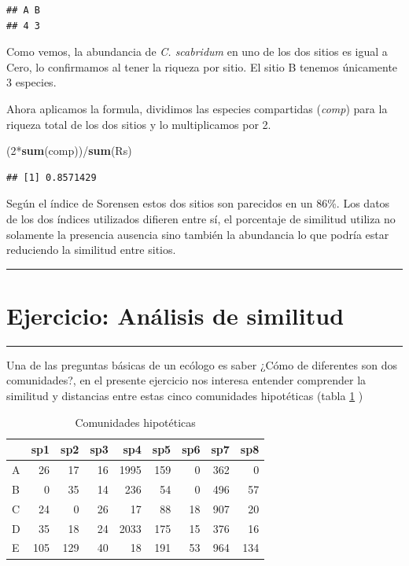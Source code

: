 \documentclass[]{book}
\newenvironment{Shaded}{\begin{snugshade}}{\end{snugshade}}
\newcommand{\KeywordTok}[1]{\textcolor[rgb]{0.13,0.29,0.53}{\textbf{{#1}}}}
\newcommand{\DecValTok}[1]{\textcolor[rgb]{0.00,0.00,0.81}{{#1}}}
\newcommand{\NormalTok}[1]{{#1}}
\begin{document}
\begin{verbatim}
## A B 
## 4 3
\end{verbatim}

Como vemos, la abundancia de \emph{C. scabridum} en uno de los dos
sitios es igual a Cero, lo confirmamos al tener la riqueza por sitio. El
sitio B tenemos únicamente 3 especies.

Ahora aplicamos la formula, dividimos las especies compartidas
(\emph{comp}) para la riqueza total de los dos sitios y lo multiplicamos
por 2.

\begin{Shaded}
\begin{Highlighting}[]
\NormalTok{(}\DecValTok{2}\NormalTok{*}\KeywordTok{sum}\NormalTok{(comp))/}\KeywordTok{sum}\NormalTok{(Rs)}
\end{Highlighting}
\end{Shaded}

\begin{verbatim}
## [1] 0.8571429
\end{verbatim}

Según el índice de Sorensen estos dos sitios son parecidos en un 86\%.
Los datos de los dos índices utilizados difieren entre sí, el porcentaje
de similitud utiliza no solamente la presencia ausencia sino también la
abundancia lo que podría estar reduciendo la similitud entre sitios.

\begin{center}\rule{0.5\linewidth}{\linethickness}\end{center}

\section{Ejercicio: Análisis de
similitud}\label{ejercicio-analisis-de-similitud}

\begin{center}\rule{0.5\linewidth}{\linethickness}\end{center}

Una de las preguntas básicas de un ecólogo es saber ¿Cómo de diferentes
son dos comunidades?, en el presente ejercicio nos interesa entender
comprender la similitud y distancias entre estas cinco comunidades
hipotéticas (tabla \ref{tab:ejer1} )

\begin{table}

\caption{\label{tab:ejer1}Comunidades hipotéticas}
\centering
\begin{tabular}[t]{lrrrrrrrr}
\toprule
  & sp1 & sp2 & sp3 & sp4 & sp5 & sp6 & sp7 & sp8\\
\midrule
A & 26 & 17 & 16 & 1995 & 159 & 0 & 362 & 0\\
B & 0 & 35 & 14 & 236 & 54 & 0 & 496 & 57\\
C & 24 & 0 & 26 & 17 & 88 & 18 & 907 & 20\\
D & 35 & 18 & 24 & 2033 & 175 & 15 & 376 & 16\\
E & 105 & 129 & 40 & 18 & 191 & 53 & 964 & 134\\
\bottomrule
\end{tabular}
\end{table}
\end{document}
